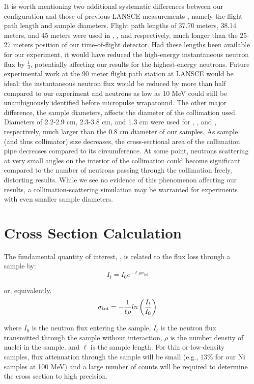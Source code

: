 It is worth mentioning two additional systematic differences between our configuration and
those of previous LANSCE measurements \cite{Shane2010, Finlay1993, Abfalterer2001}, namely the
flight path length and sample diameters. Flight path lengths of 37.70 meters, 38.14 meters, and 45
meters were used in \cite{Finlay1993}, \cite{Abfalterer2001}, and \cite{Shane2010} respectively, 
much longer than the 25-27 meters position of our time-of-flight detector.
Had these lengths been available for our experiment,
it would have reduced the high-energy instantaneous neutron flux by 
$\frac{1}{3}$, potentially affecting our results for the highest-energy neutrons. Future
experimental work at the 90 meter flight path station at LANSCE would be ideal: the
instantaneous neutron flux would be reduced by more than half compared to our experiment
and neutrons as low as 10 MeV could still be unambiguously identified before micropulse wraparound.
The other major difference, the sample diameters, affects the diameter of the collimation used.
Diameters of  2.2-2.9 cm, 2.3-3.8 cm, and 1.3 cm were used for \cite{Shane2010},
\cite{Finlay1993}, and \cite{Abfalterer2001}, respectively, much larger than the 0.8 cm diameter of
our samples. As sample (and thus collimator) size decreases, the cross-sectional area of the
collimation pipe decreases compared to its circumference. At some point,
neutrons scattering at very
small angles on the interior of the collimation could become significant compared to the number of
neutrons passing through the collimation freely, distorting results.
While we see no evidence of this phenomenon affecting
our results, a collimation-scattering simulation may be warranted for
experiments with even smaller sample diameters.

\section{Cross Section Calculation}
The fundamental quantity of interest, \tot, is related to the flux
loss through a sample by:
\begin{equation}
I_{t} = I_{0}e^{-{\ell\rho\sigma_{tot}}}
\end{equation}

\noindent
or, equivalently,
\begin{equation}
    \sigma_{\text{tot}} = -\frac{1}{\ell\rho}ln\left(\frac{I_{t}}{I_{0}}\right)
\end{equation}

\noindent
where $I_{0}$ is the neutron flux entering the sample, $I_{t}$ is the neutron
flux transmitted through the sample without interaction, $\rho$ is the number
density of nuclei in the sample, and $\ell$ is the sample length. For thin
or low-density samples, flux attenuation through the sample will be small
(e.g., 13\% for our Ni samples at 100 MeV) and a large number
of counts will be required to determine the cross section to high
precision.


